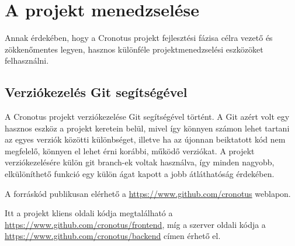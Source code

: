 \chapter{A projekt menedzselése} 

Annak érdekében, hogy a Cronotus projekt fejlesztési fázisa célra vezető és zökkenőmentes legyen, hasznos különféle projektmenedzselési
eszközöket felhasználni.

\section{Verziókezelés Git segítségével}

A Cronotus projekt verziókezelése Git\cite{gitdocs} segítségével történt. A Git azért volt egy hasznos eszköz a projekt keretein belül,
mivel így könnyen számon lehet tartani az egyes verziók közötti különbséget, illetve ha az újonnan beiktatott kód nem megfelelő, könnyen el lehet
érni korábbi, működő verziókat. A projekt verziókezelésére külön git branch-ek voltak használva, így minden nagyobb, elkülöníthető
funkció egy külön ágat kapott a jobb átláthatóság érdekében.

A forráskód publikusan elérhető a \url{https://www.github.com/cronotus} weblapon.

Itt a projekt kliens oldali kódja megtalálható a \url{https://www.github.com/cronotus/frontend}, míg a szerver oldali kódja a \url{https://www.github.com/cronotus/backend} címen érhető el.